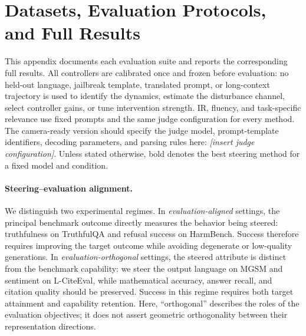 \section{Datasets, Evaluation Protocols, and Full Results}
\label{app:datasets}
\label{app:full-results}

This appendix documents each evaluation suite and reports the corresponding
full results.  All controllers are calibrated once and frozen before
evaluation: no held-out language, jailbreak template, translated prompt, or
long-context trajectory is used to identify the dynamics, estimate the
disturbance channel, select controller gains, or tune intervention strength.
IR, fluency, and task-specific relevance use fixed prompts and the same judge
configuration for every method.  The camera-ready version should specify the
judge model, prompt-template identifiers, decoding parameters, and parsing
rules here: \emph{[insert judge configuration]}.  Unless stated otherwise,
bold denotes the best steering method for a fixed model and condition.

\paragraph{Steering--evaluation alignment.}
We distinguish two experimental regimes.  In \emph{evaluation-aligned}
settings, the principal benchmark outcome directly measures the behavior being
steered: truthfulness on TruthfulQA and refusal success on HarmBench.  Success
therefore requires improving the target outcome while avoiding degenerate or
low-quality generations.  In \emph{evaluation-orthogonal} settings, the
steered attribute is distinct from the benchmark capability: we steer the
output language on MGSM and sentiment on L-CiteEval, while mathematical
accuracy, answer recall, and citation quality should be preserved.  Success in
this regime requires both target attainment and capability retention.  Here,
``orthogonal'' describes the roles of the evaluation objectives; it does not
assert geometric orthogonality between their representation directions.

